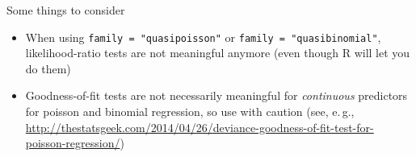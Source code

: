 \documentclass[aspectratio=169]{beamer}
\begin{document}
\begin{frame}{Some things to consider}
  \begin{itemize}
    \item When using \texttt{family = "quasipoisson"} or \texttt{family =
      "quasibinomial"}, likelihood-ratio tests are not meaningful anymore
      (even though R will let you do them)
    \item Goodness-of-fit tests are not necessarily meaningful for
      \emph{continuous} predictors for poisson and binomial regression, so
      use with caution
      (see, e.\,g.,
      \url{http://thestatsgeek.com/2014/04/26/deviance-goodness-of-fit-test-for-poisson-regression/})
  \end{itemize}
\end{frame}

% 
% 
\end{document}
